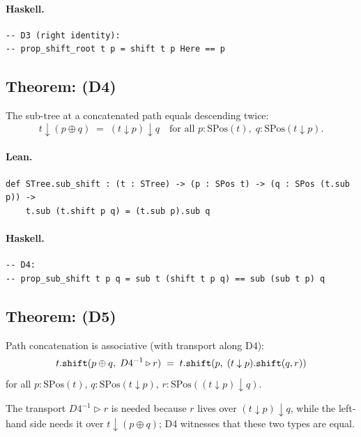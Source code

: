 \documentclass[11pt,a4paper]{article}
\begin{document}
\paragraph{Haskell.}
\begin{lstlisting}[style=haskell]
-- D3 (right identity):
-- prop_shift_root t p = shift t p Here == p
\end{lstlisting}


\subsection{Theorem:  (D4)}

\begin{thm}
The sub-tree at a concatenated path equals descending twice:
\[
  t \downarrow (p \oplus q) \;=\; (t \downarrow p) \downarrow q
  \quad\text{for all } p : \mathrm{SPos}(t),\; q : \mathrm{SPos}(t \downarrow p).
\]
\end{thm}

\paragraph{Lean.}
\begin{lstlisting}[style=lean]
def STree.sub_shift : (t : STree) -> (p : SPos t) -> (q : SPos (t.sub p)) ->
    t.sub (t.shift p q) = (t.sub p).sub q
\end{lstlisting}

\paragraph{Haskell.}
\begin{lstlisting}[style=haskell]
-- D4:
-- prop_sub_shift t p q = sub t (shift t p q) == sub (sub t p) q
\end{lstlisting}


\subsection{Theorem:  (D5)}

\begin{thm}
Path concatenation is associative (with transport along D4):
\[
  t.\texttt{shift}(p \oplus q,\; D4^{-1} \triangleright r)
  \;=\;
  t.\texttt{shift}(p,\; (t \downarrow p).\texttt{shift}(q, r))
\]
for all $p : \mathrm{SPos}(t)$, $q : \mathrm{SPos}(t \downarrow p)$,
$r : \mathrm{SPos}((t \downarrow p) \downarrow q)$.

The transport $D4^{-1} \triangleright r$ is needed because $r$ lives over
$(t \downarrow p) \downarrow q$, while the left-hand side needs it over
$t \downarrow (p \oplus q)$; D4 witnesses that these two types are equal.
\end{thm}
\end{document}
